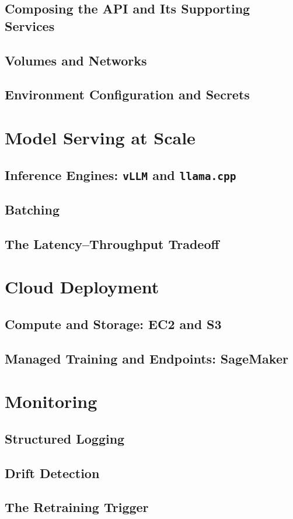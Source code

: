 \subsection{Composing the API and Its Supporting Services}

\subsection{Volumes and Networks}

\subsection{Environment Configuration and Secrets}

\section{Model Serving at Scale}
\label{sec:serving}

\subsection{Inference Engines: \texttt{vLLM} and \texttt{llama.cpp}}

\subsection{Batching}

\subsection{The Latency--Throughput Tradeoff}

\section{Cloud Deployment}
\label{sec:cloud}

\subsection{Compute and Storage: EC2 and S3}

\subsection{Managed Training and Endpoints: SageMaker}

\section{Monitoring}
\label{sec:monitoring}

\subsection{Structured Logging}

\subsection{Drift Detection}

\subsection{The Retraining Trigger}
